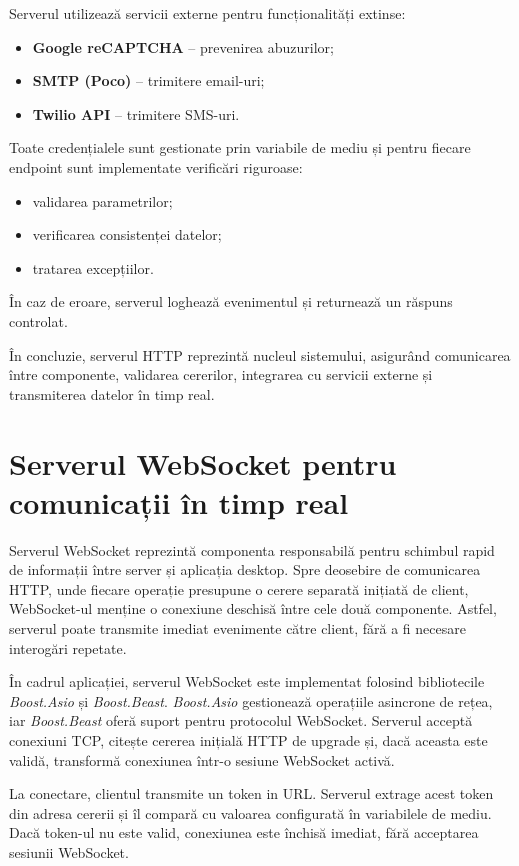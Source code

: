 Serverul utilizează servicii externe pentru funcționalități extinse:
\begin{itemize}
    \item \textbf{Google reCAPTCHA} – prevenirea abuzurilor;
    \item \textbf{SMTP (Poco)} – trimitere email-uri;
    \item \textbf{Twilio API} – trimitere SMS-uri.
\end{itemize}

Toate credențialele sunt gestionate prin variabile de mediu și pentru fiecare endpoint sunt implementate verificări riguroase:
\begin{itemize}
    \item validarea parametrilor;
    \item verificarea consistenței datelor;
    \item tratarea excepțiilor.
\end{itemize}

În caz de eroare, serverul loghează evenimentul și returnează un răspuns controlat.

În concluzie, serverul HTTP reprezintă nucleul sistemului, asigurând comunicarea între componente, validarea cererilor, integrarea cu servicii externe și transmiterea datelor în timp real.

\section{Serverul WebSocket pentru comunicații în timp real}

Serverul WebSocket reprezintă componenta responsabilă pentru schimbul rapid de informații între server și aplicația desktop. Spre deosebire de comunicarea HTTP, unde fiecare operație presupune o cerere separată inițiată de client, WebSocket-ul menține o conexiune deschisă între cele două componente. Astfel, serverul poate transmite imediat evenimente către client, fără a fi necesare interogări repetate.

În cadrul aplicației, serverul WebSocket este implementat folosind bibliotecile \textit{Boost.Asio} și \textit{Boost.Beast}. \textit{Boost.Asio} gestionează operațiile asincrone de rețea, iar \textit{Boost.Beast} oferă suport pentru protocolul WebSocket. Serverul acceptă conexiuni TCP, citește cererea inițială HTTP de upgrade și, dacă aceasta este validă, transformă conexiunea într-o sesiune WebSocket activă.

La conectare, clientul transmite un token in URL. Serverul extrage acest token din adresa cererii și îl compară cu valoarea configurată în variabilele de mediu. Dacă token-ul nu este valid, conexiunea este închisă imediat, fără acceptarea sesiunii WebSocket.

